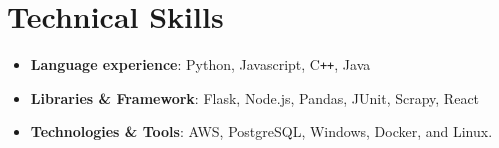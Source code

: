 \documentclass[12pt]{extarticle}
\begin{document}
\section*{Technical Skills}
\begin{itemize}
  \item \textbf{Language experience}: Python, Javascript, C\texttt{++}, Java
  \item \textbf{Libraries \& Framework}: Flask, Node.js, Pandas, JUnit, Scrapy, React
  \item \textbf{Technologies \& Tools}: AWS, PostgreSQL, Windows, Docker, and Linux.
  

\end{itemize}
\end{document}
